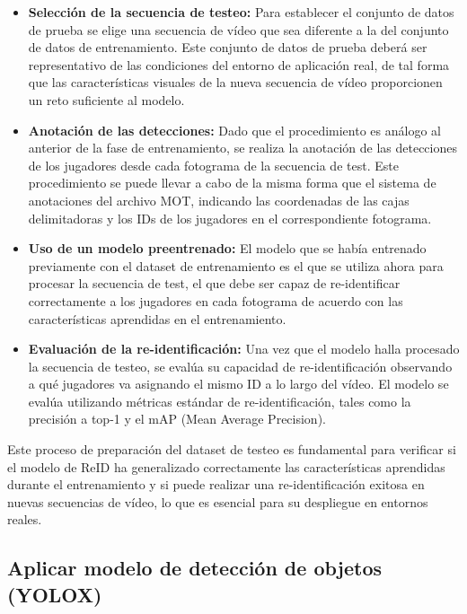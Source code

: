 \documentclass[12pt, a4paper, twoside]{article}
\begin{document}
	\begin{itemize}
		\item \textbf{Selección de la secuencia de testeo:} Para establecer el conjunto de datos de prueba se elige una secuencia de vídeo que sea diferente a la del conjunto de datos de entrenamiento. Este conjunto de datos de prueba deberá ser representativo de las condiciones del entorno de aplicación real, de tal forma que las características visuales de la nueva secuencia de vídeo proporcionen un reto suficiente al modelo.
		
		\item \textbf{Anotación de las detecciones:} Dado que el procedimiento es análogo al anterior de la fase de entrenamiento, se realiza la anotación de las detecciones de los jugadores desde cada fotograma de la secuencia de test. Este procedimiento se puede llevar a cabo de la misma forma que el sistema de anotaciones del archivo MOT, indicando las coordenadas de las cajas delimitadoras y los IDs de los jugadores en el correspondiente fotograma.
		
		\item \textbf{Uso de un modelo preentrenado:} El modelo que se había entrenado previamente con el dataset de entrenamiento es el que se utiliza ahora para procesar la secuencia de test, el que debe ser capaz de re-identificar correctamente a los jugadores en cada fotograma de acuerdo con las características aprendidas en el entrenamiento.
		
		\item \textbf{Evaluación de la re-identificación:} Una vez que el modelo halla procesado la secuencia de testeo, se evalúa su capacidad de re-identificación observando a qué jugadores va asignando el mismo ID a lo largo del vídeo. El modelo se evalúa utilizando métricas estándar de re-identificación, tales como la precisión a top-1 y el mAP (Mean Average Precision).
	\end{itemize}
	
	Este proceso de preparación del dataset de testeo es fundamental para verificar si el modelo de ReID ha generalizado correctamente las características aprendidas durante el entrenamiento y si puede realizar una re-identificación exitosa en nuevas secuencias de vídeo, lo que es esencial para su despliegue en entornos reales.
	
	
	\subsection{Aplicar modelo de detección de objetos (YOLOX)}
	
\end{document}
